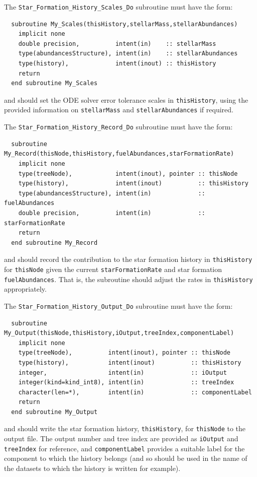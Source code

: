 The {\tt Star\_Formation\_History\_Scales\_Do} subroutine must have the form:
\begin{verbatim}
  subroutine My_Scales(thisHistory,stellarMass,stellarAbundances)
    implicit none
    double precision,          intent(in)    :: stellarMass
    type(abundancesStructure), intent(in)    :: stellarAbundances
    type(history),             intent(inout) :: thisHistory
    return
  end subroutine My_Scales
\end{verbatim}
and should set the ODE solver error tolerance scales in {\tt thisHistory}, using the provided information on {\tt stellarMass} and {\tt stellarAbundances} if required.

The {\tt Star\_Formation\_History\_Record\_Do} subroutine must have the form:
\begin{verbatim}
  subroutine My_Record(thisNode,thisHistory,fuelAbundances,starFormationRate)
    implicit none
    type(treeNode),            intent(inout), pointer :: thisNode
    type(history),             intent(inout)          :: thisHistory
    type(abundancesStructure), intent(in)             :: fuelAbundances
    double precision,          intent(in)             :: starFormationRate
    return
  end subroutine My_Record
\end{verbatim}
and should record the contribution to the star formation history in {\tt thisHistory} for {\tt thisNode} given the current {\tt starFormationRate} and star formation {\tt fuelAbundances}. That is, the subroutine should adjust the rates in {\tt thisHistory} appropriately.

The {\tt Star\_Formation\_History\_Output\_Do} subroutine must have the form:
\begin{verbatim}
  subroutine My_Output(thisNode,thisHistory,iOutput,treeIndex,componentLabel)
    implicit none
    type(treeNode),          intent(inout), pointer :: thisNode
    type(history),           intent(inout)          :: thisHistory
    integer,                 intent(in)             :: iOutput
    integer(kind=kind_int8), intent(in)             :: treeIndex
    character(len=*),        intent(in)             :: componentLabel
    return
  end subroutine My_Output
\end{verbatim}
and should write the star formation history, {\tt thisHistory}, for {\tt thisNode} to the output file. The output number and tree index are provided as {\tt iOutput} and {\tt treeIndex} for reference, and {\tt componentLabel} provides a suitable label for the component to which the history belongs (and so should be used in the name of the datasets to which the history is written for example).

